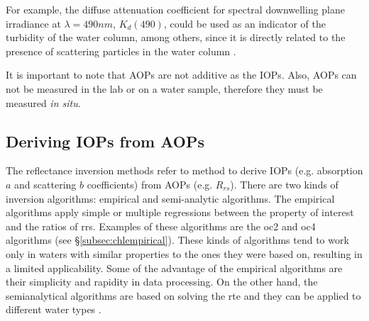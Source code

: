 For example, the diffuse attenuation coefficient for spectral downwelling plane irradiance at $\lambda=490nm$, $K_d(490)$, could be used as an indicator of the turbidity of the water column, among others, since it is directly related to the presence of scattering particles in the water column \citep{Lee2005_Kd}.


It is important to note that AOPs are not additive as the IOPs. Also, AOPs can not be measured in the lab or on a water sample, therefore they must be measured {\it in situ}.

\subsection{Deriving IOPs from AOPs}
\label{subsec:semianalitic}
The reflectance inversion methods refer to method to derive IOPs (e.g. absorption $a$ and scattering $b$ coefficients) from AOPs (e.g. $R_{rs}$). There are two kinds of inversion algorithms: empirical and semi-analytic algorithms. The empirical algorithms apply simple or multiple regressions between the property of interest and the ratios of \gls{rrs}. Examples of these algorithms are the \acrfull{oc2} and \acrfull{oc4} algorithms (see \S\ref{subsec:chlempirical}). These kinds of algorithms tend to work only in waters with similar properties to the ones they were based on, resulting in a limited applicability. Some of the advantage of the empirical algorithms are their simplicity and rapidity in data processing. On the other hand, the semianalytical algorithms are based on solving the \gls{rte} and they can be applied to different water types \citep{Lee2002_invQAA}.

